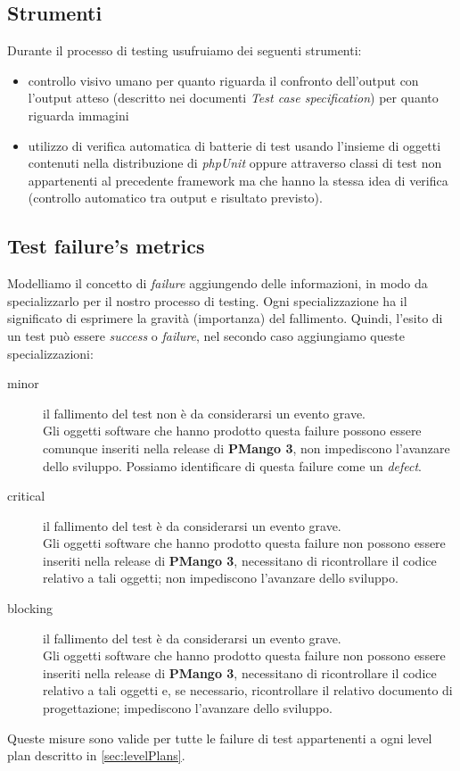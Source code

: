 \subsection{Strumenti}
\label{subsec:testingTools}
Durante il processo di testing usufruiamo dei seguenti strumenti:
\begin{itemize}
  \item controllo visivo umano per quanto riguarda il confronto dell'output
  con l'output atteso (descritto nei documenti \emph{Test case specification})
  per quanto riguarda immagini
  \item utilizzo di verifica automatica di batterie di test usando l'insieme di
  oggetti contenuti nella distribuzione di \emph{phpUnit} oppure attraverso
  classi di test non appartenenti al precedente framework ma che hanno la
  stessa idea di verifica (controllo automatico tra output e risultato
  previsto).
\end{itemize}

\subsection{Test failure's metrics}
Modelliamo il concetto di \emph{failure} aggiungendo delle informazioni, in
modo da specializzarlo per il nostro processo di testing. Ogni
specializzazione ha il significato di esprimere la gravit\`a (importanza) del
fallimento. Quindi, l'esito di un test pu\`o essere \emph{success} o
\emph{failure}, nel secondo caso aggiungiamo queste specializzazioni:
\begin{description}
  \item[minor] il fallimento del test non \`e da considerarsi un evento grave.\\
  Gli oggetti software che hanno prodotto questa failure possono essere comunque
  inseriti nella release di \textbf{PMango 3}, non impediscono l'avanzare dello
  sviluppo. Possiamo identificare di questa failure come un \emph{defect}.
  \item[critical] il fallimento del test \`e da considerarsi un evento grave.\\
  Gli oggetti software che hanno prodotto questa failure non possono essere
  inseriti nella release di \textbf{PMango 3}, necessitano di ricontrollare il
  codice relativo a tali oggetti; non impediscono l'avanzare dello sviluppo.
  \item[blocking] il fallimento del test \`e da considerarsi un evento grave.\\
  Gli oggetti software che hanno prodotto questa failure non possono essere
  inseriti nella release di \textbf{PMango 3}, necessitano di ricontrollare il
  codice relativo a tali oggetti e, se necessario, ricontrollare il relativo
  documento di progettazione; impediscono l'avanzare dello sviluppo.
\end{description}
Queste misure sono valide per tutte le failure di test appartenenti a ogni
level plan descritto in \ref{sec:levelPlans}.


